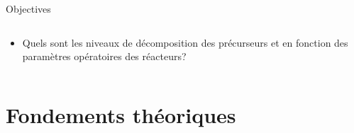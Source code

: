 \documentclass[aspectratio=169,pdf,t]{beamer}
\begin{document}
\begin{frame}{\insertsection}{Objectives}
\begin{columns}[T]
\begin{column}{0.7\textwidth}
\begin{itemize}
      \item \alert<2->{Quels sont les niveaux de décomposition des précurseurs  et  en fonction des paramètres opératoires des réacteurs?}
    \end{itemize}
    \end{column}
    \begin{column}{0.3\textwidth}
      \vspace{0.5cm}
      \begin{center}
      \end{center}
    \end{column}
  \end{columns}
\end{frame}


\section{Fondements théoriques}
\end{document}
